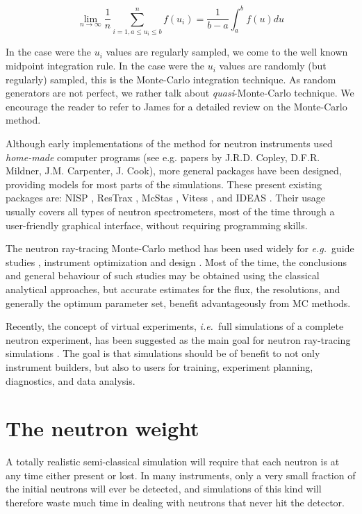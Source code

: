 \begin{equation}
\lim_{n \rightarrow \infty} \frac{1}{n} \sum_{i=1, a \leq u_i \leq b}^n f(u_i) = \frac{1}{b-a}\int_a^b f(u) du
\end{equation}

In the case were the $u_i$ values are regularly sampled, we come to the well known midpoint integration rule. In the case were the $u_i$ values are randomly (but regularly) sampled, this is the Monte-Carlo integration technique. As random generators are not perfect, we rather talk about \emph{quasi}-Monte-Carlo technique. We encourage the reader to refer to James \cite{James80} for a detailed review on the Monte-Carlo method.

Although early implementations of the method for neutron instruments used \emph{home-made} computer programs  (see e.g. papers by J.R.D. Copley, D.F.R. Mildner, J.M. Carpenter, J. Cook), more general packages have been designed, providing models for most parts of the simulations.
These present existing packages are: NISP \cite{NISP}, ResTrax \cite{Restrax}, McStas \cite{nn_10_20,mcstas_pb,mcstas_webpage}, Vitess \cite{Vitess,vitess_webpage}, and IDEAS \cite{IDEAS}.
Their usage usually covers all types of neutron spectrometers, most of the time through a user-friendly graphical interface, without requiring programming skills.

The neutron ray-tracing Monte-Carlo method has been used widely for 
{\em e.g.}\ guide studies \cite{Copley93,Farhi02,Schanzer04}, 
instrument optimization and design \cite{Zsigmond04,Lieutenant05}. 
Most of the time, the conclusions and general behaviour of such studies 
may be obtained using the classical analytical approaches, 
but accurate estimates for the flux, the resolutions, 
and generally the optimum parameter set, benefit advantageously from MC methods.

Recently, the concept of virtual experiments, {\em i.e.}\ full simulations
of a complete neutron experiment, has been suggested as the main 
goal for neutron ray-tracing simulations \cite{lefmann05}. The goal is that
simulations should be of benefit to not only instrument builders, but also
to users for training, experiment planning, diagnostics, and data analysis.

\section{The neutron weight}
\label{s:probweight}
A totally realistic semi-classical simulation will require that
each neutron is at any time either present or lost.
In many instruments, only a very
small fraction of the initial neutrons will ever be detected, and
simulations of this kind will therefore waste much time in dealing
with neutrons that never hit the detector.


